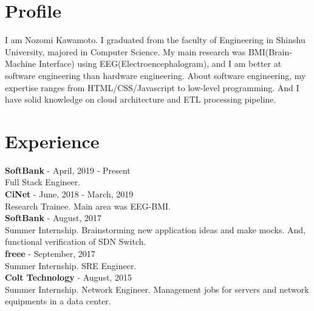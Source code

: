 \documentclass[11pt]{article} %
\begin{document}
\begin{paracol}{2}
\switchcolumn %

\section{Profile}
I am Nozomi Kawamoto. I graduated from the faculty of Engineering in Shinshu University, majored in Computer Science. 
My main research was BMI(Brain-Machine Interface) using EEG(Electroencephalogram), and I am better at software engineering than hardware engineering.
About software engineering, my expertise ranges from HTML/CSS/Javascript to low-level programming. And I have solid knowledge on cloud architecture and ETL processing pipeline. 

\vspace{1cm}

\section{Experience}
\textbf{\color{subtitle}SoftBank} \hspace{0.5mm} {\color{subtitle} - April, 2019 - Present}\\
Full Stack Engineer.\\

\textbf{\color{subtitle}CiNet} \hspace{0.5mm} {\color{subtitle} - June, 2018 - March, 2019}\\
Research Trainee. Main area was EEG-BMI.\\

\textbf{\color{subtitle}SoftBank} \hspace{0.5mm} {\color{subtitle} - August, 2017}\\
Summer Internship. Brainstorming new application ideas and make mocks. And, functional verification of SDN Switch.\\

\textbf{\color{subtitle}freee} \hspace{0.5mm} {\color{subtitle} - September, 2017}\\
Summer Internship. SRE Engineer.\\

\textbf{\color{subtitle}Colt Technology} \hspace{0.5mm} {\color{subtitle} - August, 2015}\\
Summer Internship. Network Engineer. Management jobs for servers and network equipments in a data center.\\


\end{paracol}
\end{document}
